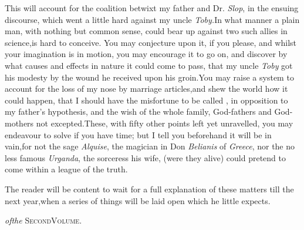 \documentclass{article}
\begin{document}
This will account for the coalition betwixt my father and Dr.\@
\textit{Slop}, in the ensuing discourse, which went a little
hard against my uncle \textit{Toby.}\tsk In what manner a plain
man, with nothing but common sense, could bear up against two
such allies in science,\tsk is hard to conceive.\tsk\break
You may conjecture upon it, if you please,\break
\tsk and whilst your imagination is in motion, you may encourage
it to go on, and discover by what causes and effects in nature
it could come to pass, that my uncle \textit{Toby} got his
modesty by the wound he received upon his groin.\tsk You may
raise a system to account for the loss of my nose by
marriage articles,\tsk and shew the world how it could happen,
that I should have the misfortune to be called
, in opposition to my father’s\pb
hypothesis, and the wish of the whole family, God-fathers and
God-mothers not excepted.\tsk These, with fifty other points left
yet unravelled, you may endeavour to solve if you have time;\tsh
but I tell you beforehand it will be in vain,\break\tsk for not the sage
\textit{Alquise}, the magician in Don \textit{Belianis} of
\textit{Greece}, nor the no less famous \textit{Urganda}, the
sorceress his wife, (were they alive) could pretend to come
within a league of the truth.

The reader will be content to wait for a full explanation of
these matters till the next year,\tsk when a series of
things will be laid open which he little expects.

\bigskip
\bigskip
\centerline{\textit{\enspace of\enspace the}\enspace
\textsc{Second\enspace Volume}.}
\end{document}
